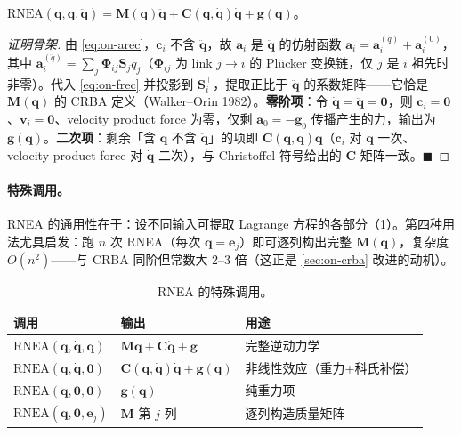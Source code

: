 \begin{theorem}\label{thm:on-rnea-correct}
$\mathrm{RNEA}(\mathbf q,\dot{\mathbf q},\ddot{\mathbf q})=\mathbf M(\mathbf q)\ddot{\mathbf q}+\mathbf C(\mathbf q,\dot{\mathbf q})\dot{\mathbf q}+\mathbf g(\mathbf q)$。
\end{theorem}
\begin{proof}[证明骨架]
由 \cref{eq:on-arec}，$\mathbf c_i$ 不含 $\ddot{\mathbf q}$，故 $\mathbf a_i$ 是 $\ddot{\mathbf q}$ 的仿射函数 $\mathbf a_i=\mathbf a_i^{(\ddot q)}+\mathbf a_i^{(0)}$，其中 $\mathbf a_i^{(\ddot q)}=\sum_{j}\boldsymbol\Phi_{ij}\mathbf S_j\ddot q_j$（$\boldsymbol\Phi_{ij}$ 为 link $j\to i$ 的 Plücker 变换链，仅 $j$ 是 $i$ 祖先时非零）。代入 \cref{eq:on-frec} 并投影到 $\mathbf S_i^\top$，提取正比于 $\ddot{\mathbf q}$ 的系数矩阵——它恰是 $\mathbf M(\mathbf q)$ 的 CRBA 定义（Walker--Orin 1982）。\textbf{零阶项}：令 $\dot{\mathbf q}=\ddot{\mathbf q}=\mathbf 0$，则 $\mathbf c_i=\mathbf 0$、$\mathbf v_i=\mathbf 0$、velocity product force 为零，仅剩 $\mathbf a_0=-\mathbf g_0$ 传播产生的力，输出为 $\mathbf g(\mathbf q)$。\textbf{二次项}：剩余「含 $\dot{\mathbf q}$ 不含 $\ddot{\mathbf q}$」的项即 $\mathbf C(\mathbf q,\dot{\mathbf q})\dot{\mathbf q}$（$\mathbf c_i$ 对 $\dot{\mathbf q}$ 一次、velocity product force 对 $\dot{\mathbf q}$ 二次），与 Christoffel 符号给出的 $\mathbf C$ 矩阵一致。$\blacksquare$
\end{proof}

\paragraph{特殊调用。}
RNEA 的通用性在于：设不同输入可提取 Lagrange 方程的各部分（\cref{tab:on-rnea-calls}）。第四种用法尤具启发：跑 $n$ 次 RNEA（每次 $\ddot{\mathbf q}=\mathbf e_j$）即可逐列构出完整 $\mathbf M(\mathbf q)$，复杂度 $O(n^2)$——与 CRBA 同阶但常数大 2--3 倍（这正是 \cref{sec:on-crba} 改进的动机）。

\begin{table}[H]\centering\small
\caption{RNEA 的特殊调用。}
\label{tab:on-rnea-calls}
\begin{tabular}{lll}
\toprule
调用 & 输出 & 用途 \\
\midrule
$\mathrm{RNEA}(\mathbf q,\dot{\mathbf q},\ddot{\mathbf q})$ & $\mathbf M\ddot{\mathbf q}+\mathbf C\dot{\mathbf q}+\mathbf g$ & 完整逆动力学 \\
$\mathrm{RNEA}(\mathbf q,\dot{\mathbf q},\mathbf 0)$ & $\mathbf C(\mathbf q,\dot{\mathbf q})\dot{\mathbf q}+\mathbf g(\mathbf q)$ & 非线性效应（重力+科氏补偿） \\
$\mathrm{RNEA}(\mathbf q,\mathbf 0,\mathbf 0)$ & $\mathbf g(\mathbf q)$ & 纯重力项 \\
$\mathrm{RNEA}(\mathbf q,\mathbf 0,\mathbf e_j)$ & $\mathbf M$ 第 $j$ 列 & 逐列构造质量矩阵 \\
\bottomrule
\end{tabular}
\end{table}

